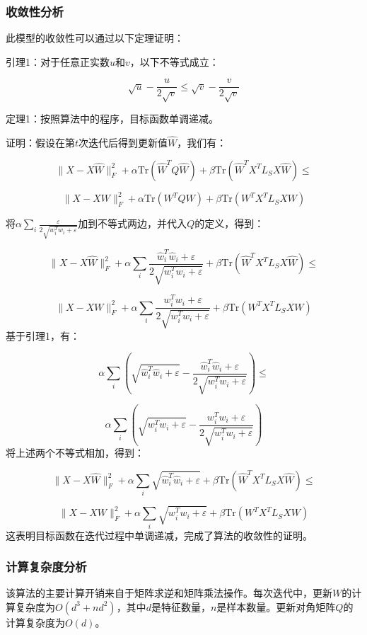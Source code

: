 \documentclass[12pt,a4paper,UTF8]{article}
\begin{document}
  \subsubsection{收敛性分析}
  
	此模型的收敛性可以通过以下定理证明：
	
	引理1：对于任意正实数$u$和$v$，以下不等式成立：

	$$
		\sqrt{u} - \frac{u}{2\sqrt{v}} \leq \sqrt{v} - \frac{v}{2\sqrt{v}}
	$$
	
	定理1：按照算法中的程序，目标函数单调递减。
	
	证明：假设在第$t$次迭代后得到更新值$\hat{W}$，我们有：
	
	
	$$
		\|X - X\hat{W}\|_F^2 + \alpha\text{Tr}(\hat{W}^TQ\hat{W}) + \beta\text{Tr}(\hat{W}^TX^TL_SX\hat{W}) \leq 
	$$
	
	$$
	\|X - XW\|_F^2 + \alpha\text{Tr}(W^TQW) + \beta\text{Tr}(W^TX^TL_SXW)
	$$

	将$\alpha\sum_i \frac{\varepsilon}{2\sqrt{w_i^Tw_i+\varepsilon}}$加到不等式两边，并代入$Q$的定义，得到：
	
	$$
			\|X - X\hat{W}\|_F^2 + \alpha\sum_i \frac{\hat{w}_i^T\hat{w}_i + \varepsilon}{2\sqrt{w_i^Tw_i+\varepsilon}} + \beta\text{Tr}(\hat{W}^TX^TL_SX\hat{W}) \leq 
	$$
	
	$$
	\|X - XW\|_F^2 + \alpha\sum_i \frac{w_i^Tw_i + \varepsilon}{2\sqrt{w_i^Tw_i+\varepsilon}} + \beta\text{Tr}(W^TX^TL_SXW)
	$$
	基于引理1，有：
	
	$$
	\alpha\sum_i \left(\sqrt{\hat{w}_i^T\hat{w}_i + \varepsilon} - \frac{\hat{w}_i^T\hat{w}_i + \varepsilon}{2\sqrt{w_i^Tw_i+\varepsilon}}\right) \leq
	$$
	
	$$
	 \alpha\sum_i \left(\sqrt{w_i^Tw_i + \varepsilon} - \frac{w_i^Tw_i + \varepsilon}{2\sqrt{w_i^Tw_i+\varepsilon}}\right)
	$$
	将上述两个不等式相加，得到：
	
	$$
	\|X - X\hat{W}\|_F^2 + \alpha\sum_i \sqrt{\hat{w}_i^T\hat{w}_i + \varepsilon} + \beta\text{Tr}(\hat{W}^TX^TL_SX\hat{W}) \leq
	$$
	
	$$
	 \|X - XW\|_F^2 + \alpha\sum_i \sqrt{w_i^Tw_i + \varepsilon} + \beta\text{Tr}(W^TX^TL_SXW)
	$$
	这表明目标函数在迭代过程中单调递减，完成了算法的收敛性的证明。
	
	\subsubsection{计算复杂度分析}
	该算法的主要计算开销来自于矩阵求逆和矩阵乘法操作。每次迭代中，更新$W$的计算复杂度为$O(d^3 + nd^2)$，其中$d$是特征数量，$n$是样本数量。更新对角矩阵$Q$的计算复杂度为$O(d)$。
 
\end{document}
